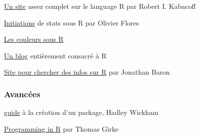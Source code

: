 \documentclass[11, a4paper, landscape]{article}
\newif\ifadvanced
\newcommand{\adv}[1]{\ifadvanced #1 \fi}
\begin{document}
\begin{multicols*}{3}
\href{http://www.statmethods.net/index.html}{Un site} assez complet sur le language R par Robert I. Kabacoff

\href{http://olivierflores.free.fr/?q=R}{Initiations} de stats sous R par Olivier Flores

\href{http://research.stowers-institute.org/efg/R/Color/Chart/index.htm}{Les couleurs sous R} 

\href{http://www.r-bloggers.com/}{Un blog} entièrement consacré à R

\href{http://search.r-project.org/}{Site pour chercher des infos sur R} par Jonathan Baron

\subsubsection{Avancées}

\href{http://r-pkgs.had.co.nz/}{guide} à la création d'un package, Hadley Wickham 

\href{http://manuals.bioinformatics.ucr.edu/home/programming-in-r}{Programming in R} par Thomas Girke

\end{multicols*}

\adv{
  \printindex
  \addcontentsline{toc}{subsection}{Index}
}
\end{document}

